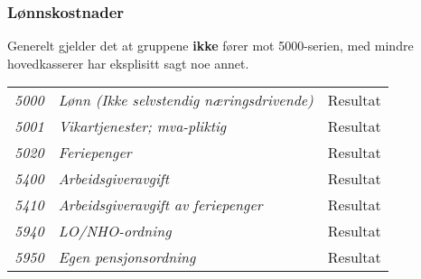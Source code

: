 \subsubsection*{Lønnskostnader}
Generelt gjelder det at gruppene {\bfseries ikke} fører mot 5000-serien, med mindre hovedkasserer har eksplisitt sagt noe annet.
\begin{table}[H]
	\begin{tabular}{l l l }
\emph{5000} & \emph{Lønn (Ikke selvstendig næringsdrivende)} & Resultat\\
\emph{5001} & \emph{Vikartjenester; mva-pliktig} & Resultat\\
\emph{5020} & \emph{Feriepenger} & Resultat\\
\emph{5400} & \emph{Arbeidsgiveravgift} & Resultat\\
\emph{5410} & \emph{Arbeidsgiveravgift av feriepenger} & Resultat\\
\emph{5940} & \emph{LO/NHO-ordning} & Resultat\\
\emph{5950} & \emph{Egen pensjonsordning} & Resultat\\
	\end{tabular}
\end{table}
